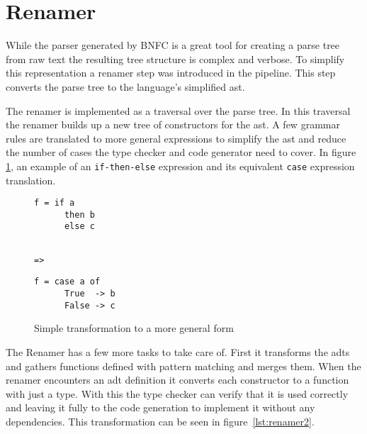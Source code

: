 \section{Renamer}

While the parser generated by BNFC is a great tool for creating a parse tree from raw text the resulting tree structure is complex and verbose. To simplify this representation a renamer step was introduced in the pipeline. This step converts the parse tree to the language's simplified \gls{ast}. 

The renamer is implemented as a traversal over the parse tree. In this traversal the renamer builds up a new tree of constructors for the \gls{ast}. A few grammar rules are translated to more general expressions to simplify the \gls{ast} and reduce the number of cases the type checker and code generator need to cover. In figure \ref{lst:renamer1}, an example of an \texttt{if-then-else} expression and its equivalent \texttt{case} expression translation.

\begin{figure}[ht]
\centering
{}%
\begin{minipage}[t]{0.30\linewidth}
    \centering
    \begin{lstlisting}
f = if a
      then b
      else c
    \end{lstlisting}
\end{minipage}
\begin{minipage}[t]{0.09\linewidth}
    \centering
    \begin{lstlisting}

=>
    \end{lstlisting}
\end{minipage}
\begin{minipage}[t]{0.30\linewidth}
    \centering
    \begin{lstlisting}
f = case a of
      True  -> b
      False -> c
    \end{lstlisting}
\end{minipage}
\caption{Simple transformation to a more general form}
\label{lst:renamer1}
\end{figure}

The Renamer has a few more tasks to take care of. First it transforms the \glspl{adt} and gathers functions defined with pattern matching and merges them. When the renamer encounters an \gls{adt} definition it converts each constructor to a function with just a type. With this the type checker can verify that it is used correctly and leaving it fully to the code generation to implement it without any dependencies. This transformation can be seen in figure~\ref{lst:renamer2}.

